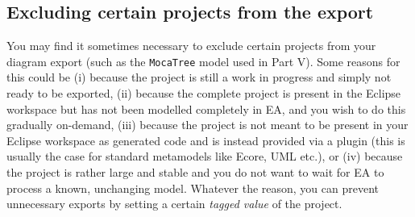 \newpage
\subsection{Excluding certain projects from the export}

You may find it sometimes necessary to exclude certain projects from your diagram export (such as the \texttt{MocaTree} model used in Part V).
Some reasons for this could be (i) because the project is still a work in progress and simply not ready to be exported, (ii) because the
complete project is present in the Eclipse workspace but has not been modelled completely in EA, and you wish to do this gradually on-demand, (iii) because the
project is not meant to be present in your Eclipse workspace as generated code and is instead provided via a plugin (this is usually the case for standard
metamodels like Ecore, UML etc.), or (iv) because the project is rather large and stable and you do not want to wait for EA to process a known, unchanging
model. Whatever the reason, you can prevent unnecessary exports by setting a certain \emph{tagged value} of the project.

